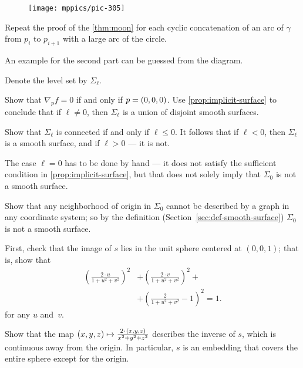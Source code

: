 \begin{multicols}{2}
\begin{wrapfigure}{r}{25 mm}
\vskip-6mm
\centering
\texttt{[image: mppics/pic-305]}
\vskip0mm
\end{wrapfigure}

Repeat the proof of the \ref{thm:moon} for each cyclic concatenation of an arc of $\gamma$ from $p_i$ to $p_{i+1}$ with a large arc of the circle. 

An example for the second part can be guessed from the diagram.


\setcounter{eqtn}{0}

Denote the level set by $\Sigma_\ell$.

Show that $\nabla_p f=0$ if and only if $p\z=(0,0,0)$.
Use \ref{prop:implicit-surface} to conclude that if $\ell\ne 0$, then $\Sigma_\ell$ is a union of disjoint smooth surfaces.

Show that $\Sigma_\ell$ is connected if and only if $\ell\le 0$.
It follows that if $\ell<0$, then $\Sigma_\ell$ is a smooth surface, and if $\ell>0$ --- it is not.

The case $\ell=0$ has to be done by hand --- it does not satisfy the sufficient condition in \ref{prop:implicit-surface}, but that does not solely imply that $\Sigma_0$ is not a smooth surface.

Show that any neighborhood of origin in $\Sigma_0$ cannot be described by a graph in any coordinate system;
so by the definition (Section~\ref{sec:def-smooth-surface}) $\Sigma_0$ is not a smooth surface.

First, check that the image of $s$ lies in the unit sphere centered at $(0,0,1)$;
that is, show that 
\begin{align*}
\left(\tfrac{2\cdot u}{1+u^2+v^2}\right)^2
&+
\left(\tfrac{2\cdot v}{1+u^2+v^2}\right)^2+
\\
&+\left(\tfrac{2}{1+u^2+v^2}-1\right)^2=1.
\end{align*}
for any $u$ and~$v$.

Show that the map 
$(x,y,z)\z\mapsto \tfrac{2\cdot(x,y,z)}{x^2+y^2+z^2}$
describes the inverse of $s$, which is continuous away from the origin.
In particular, $s$ is an embedding that covers the entire sphere except for the origin.


\end{multicols}
